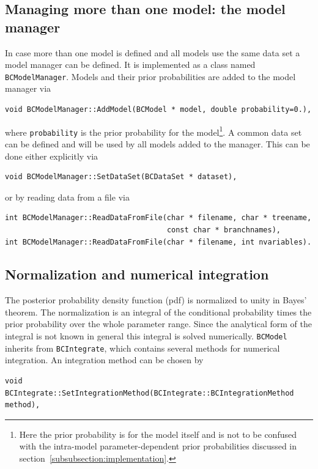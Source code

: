 \documentclass[11pt, a4paper]{article}
\newcommand{\code}[1]{\texttt{#1}}
\begin{document}
\subsection{Managing more than one model: the model manager}
\label{subsection:modelmanager}

In case more than one model is defined and all models use the same
data set a model manager can be defined. It is implemented as a class
named \verb|BCModelManager|. Models and their prior probabilities are
added to the model manager via
%
\begin{verbatim}
void BCModelManager::AddModel(BCModel * model, double probability=0.),
\end{verbatim}
%
where \verb|probability| is the prior probability for the
model\footnote{Here the prior probability is for the model itself and
  is not to be confused with the intra-model parameter-dependent prior
  probabilities discussed in
  section~\ref{subsubsection:implementation}.}. A common data set can
be defined and will be used by all models added to the manager. This
can be done either explicitly via
%
\begin{verbatim}
void BCModelManager::SetDataSet(BCDataSet * dataset),
\end{verbatim}
%
or by reading data from a file via
%
\begin{verbatim}
int BCModelManager::ReadDataFromFile(char * filename, char * treename,
                                     const char * branchnames),
int BCModelManager::ReadDataFromFile(char * filename, int nvariables).
\end{verbatim}


\subsection{Normalization and numerical integration}
\label{section:normalization}

The posterior probability density function (pdf) is normalized to
unity in Bayes' theorem. The normalization is an integral of the
conditional probability times the prior probability over the whole
parameter range. Since the analytical form of the integral is not
known in general this integral is solved numerically. \code{BCModel}
inherits from \code{BCIntegrate}, which contains several methods for
numerical integration. An integration method can be chosen by
%
\begin{verbatim}
void BCIntegrate::SetIntegrationMethod(BCIntegrate::BCIntegrationMethod method),
\end{verbatim}
\end{document}
